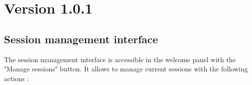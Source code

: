 


\maketitle

\section{Version 1.0.1}
\subsection{Session management interface}
The session management interface is accessible in the welcome panel with the "Manage sessions" button. It allows to manage current sessions with the following actions :\\
